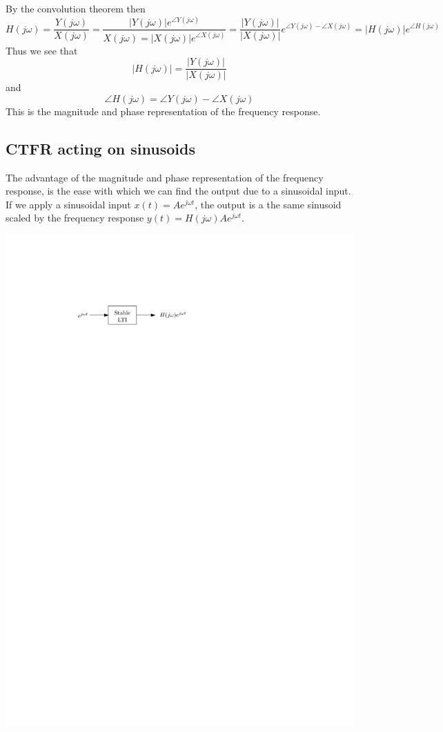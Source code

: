 By the convolution theorem then
  \[
  H(j\omega) = \frac{Y(j\omega)}{X(j\omega)} = \frac{|Y(j\omega)|e^{\angle Y(j\omega)}}{X(j\omega) = |X(j\omega)|e^{\angle X(j\omega)}} = \frac{|Y(j\omega)|}{|X(j\omega)|}e^{\angle Y(j\omega) - \angle X(j\omega)} = |H(j\omega)|e^{\angle H(j\omega)}
  \]
  Thus we see that
  \[
  |H(j\omega)| = \frac{|Y(j\omega)|}{|X(j\omega)|}
  \]
  and
  \[
  \angle H(j\omega) = \angle Y(j\omega) - \angle X(j\omega)
  \]
  This is the magnitude and phase representation of the frequency response.
  
\subsection{CTFR acting on sinusoids}

The advantage of the magnitude and phase representation of the frequency response, is the ease with which we can find the output due to a sinusoidal input. If we apply a sinusoidal input $x(t) = A e^{j\omega t}$, the output is a the same sinusoid scaled by the frequency response $y(t) = H(j\omega) A e^{j\omega t}$.

\begin{center}
  \includegraphics[scale=1]{graphics/18-ct-fr.pdf}
\end{center}


